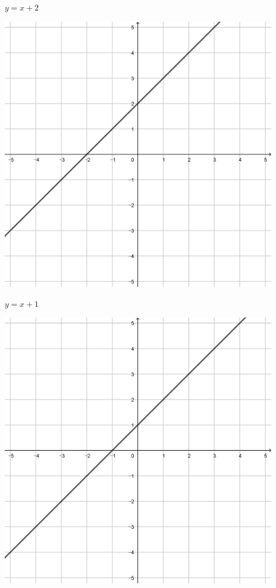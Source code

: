 \documentclass[a4paper]{oblivoir}
\begin{document}
\begin{minipage}{0.45\textwidth}\centering
\(y=x+2\)
\par\bigskip\includegraphics[width=0.9\textwidth]{img/1-1}
\end{minipage}
\begin{minipage}{0.45\textwidth}\centering
\(y=x+1\)
\par\bigskip\includegraphics[width=0.9\textwidth]{img/1-2}
\end{minipage}\bigskip\bigskip\par
\end{document}
